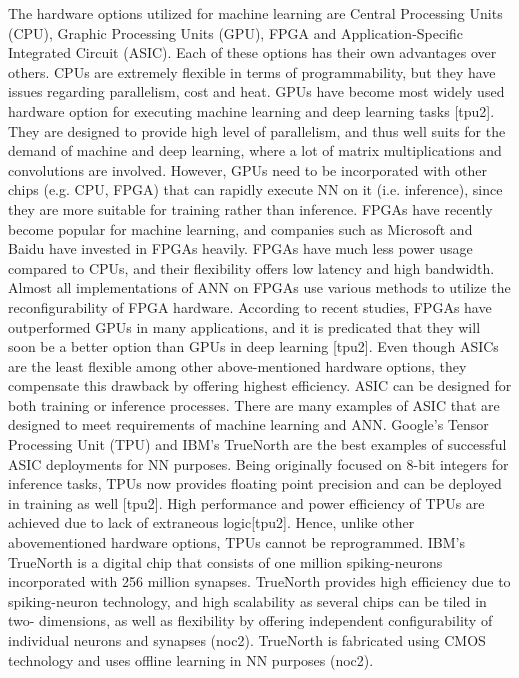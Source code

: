 The hardware options utilized for machine learning are Central Processing Units (CPU), Graphic
Processing Units (GPU), FPGA and Application-Specific Integrated Circuit (ASIC). 
Each of these options has their own advantages over others. CPUs are extremely flexible in terms of programmability, but they have issues regarding parallelism, cost and heat. 
GPUs have become most widely used hardware option for executing machine learning and deep learning tasks [tpu2]. They are designed to provide high level of parallelism, and thus well suits for the demand of machine and deep learning, where a lot of
matrix multiplications and convolutions are involved.
However, GPUs need to be incorporated with other
chips (e.g. CPU, FPGA) that can rapidly execute NN on it (i.e. inference), since they are more suitable for
training rather than inference. 
FPGAs have recently become popular for machine learning, and companies such as Microsoft and Baidu have invested in FPGAs heavily. 
FPGAs have much less power usage compared to CPUs, and their flexibility offers low latency and high bandwidth. Almost all implementations of ANN on FPGAs use various methods to utilize the reconfigurability of FPGA
hardware. 
According to recent studies, FPGAs have outperformed GPUs in many applications, and it is predicated that they will soon be a better option than GPUs in deep learning [tpu2]. Even though ASICs are the least flexible among other above-mentioned hardware options, they compensate this drawback by offering highest efficiency. ASIC can be designed for both training or inference processes.
There are many examples of ASIC that are designed to meet requirements of machine learning and ANN.
Google’s Tensor Processing Unit (TPU) and IBM’s TrueNorth are the best examples of successful ASIC
deployments for NN purposes. Being originally focused on 8-bit integers for inference tasks, TPUs now
provides floating point precision and can be deployed in training as well [tpu2]. High performance and
power efficiency of TPUs are achieved due to lack of extraneous logic[tpu2]. Hence, unlike other
abovementioned hardware options, TPUs cannot be reprogrammed. IBM’s TrueNorth is a digital chip that
consists of one million spiking-neurons incorporated with 256 million synapses. TrueNorth provides high
efficiency due to spiking-neuron technology, and high scalability as several chips can be tiled in two-
dimensions, as well as flexibility by offering independent configurability of individual neurons and
synapses (noc2). TrueNorth is fabricated using CMOS technology and uses offline learning in NN
purposes (noc2).
